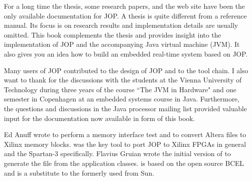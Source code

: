 For a long time the thesis, some research papers, and the web site
have been the only available documentation for JOP. A thesis is quite
different from a reference manual. Its focus is on research results
and implementation details are usually omitted. This book complements
the thesis and provides insight into the implementation of JOP and
the accompanying Java virtual machine (JVM). It also gives you an
idea how to build an embedded real-time system based on JOP.


Many users of JOP contributed to the design of JOP and to the tool
chain. I also want to thank for the discussions with the students at
the Vienna University of Technology during three years of the course
``The JVM in Hardware" and one semester in Copenhagen at an embedded
systems course in Java. Furthermore, the questions and discussions in
the Java processor mailing list provided valuable input for the
documentation now available in form of this book.

Ed Anuff wrote  to perform a memory interface test
and  to convert Altera  files to
Xilinx memory blocks.  was the key tool to port
JOP to Xilinx FPGAs in general and the Spartan-3 specifically.
Flavius Gruian wrote the initial version of  to generate
the  file from the application classes.  is
based on the open source BCEL and is a substitute to the formerly
used  from Sun.
